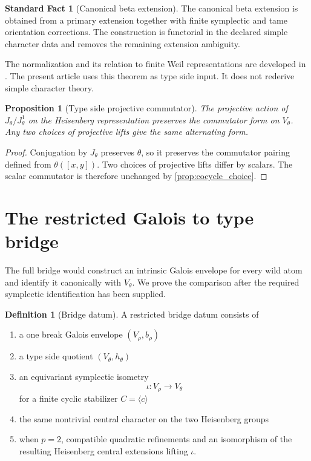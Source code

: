 \documentclass[11pt]{amsart}
\newtheorem{proposition}[proposition]{Proposition}
\theoremstyle{definition}
\newtheorem{definition}[definition]{Definition}
\newtheorem{standardfact}[standardfact]{Standard Fact}
\theoremstyle{remark}
\begin{document}
\begin{standardfact}[Canonical beta extension]\label{fact:canonical_beta}
The canonical beta extension is obtained from a primary extension together with finite symplectic and tame orientation corrections. The construction is functorial in the declared simple character data and removes the remaining extension ambiguity.
\end{standardfact}

The normalization and its relation to finite Weil representations are developed in \cite{Blondel2012,Dotto2022}. The present article uses this theorem as type side input. It does not rederive simple character theory.

\begin{proposition}[Type side projective commutator]\label{prop:type_commutator}
The projective action of \(J_\theta/J_\theta^1\) on the Heisenberg representation preserves the commutator form on \(V_\theta\). Any two choices of projective lifts give the same alternating form.
\end{proposition}

\begin{proof}
Conjugation by \(J_\theta\) preserves \(\theta\), so it preserves the commutator pairing defined from \(\theta([x,y])\). Two choices of projective lifts differ by scalars. The scalar commutator is therefore unchanged by \cref{prop:cocycle_choice}.
\end{proof}

\section{The restricted Galois to type bridge}\label{sec:bridge}

The full bridge would construct an intrinsic Galois envelope for every wild atom and identify it canonically with \(V_\theta\). We prove the comparison after the required symplectic identification has been supplied.

\begin{definition}[Bridge datum]\label{def:bridge_datum}
A restricted bridge datum consists of

\begin{enumerate}
\item a one break Galois envelope \((V_\rho,b_\rho)\)
\item a type side quotient \((V_\theta,h_\theta)\)
\item an equivariant symplectic isometry
\[
\iota:V_\rho\longrightarrow V_\theta
\]
for a finite cyclic stabilizer \(C=\langle c\rangle\)
\item the same nontrivial central character on the two Heisenberg groups
\item when \(p=2\), compatible quadratic refinements and an isomorphism of the resulting Heisenberg central extensions lifting \(\iota\).
\end{enumerate}
\end{definition}
\end{document}
